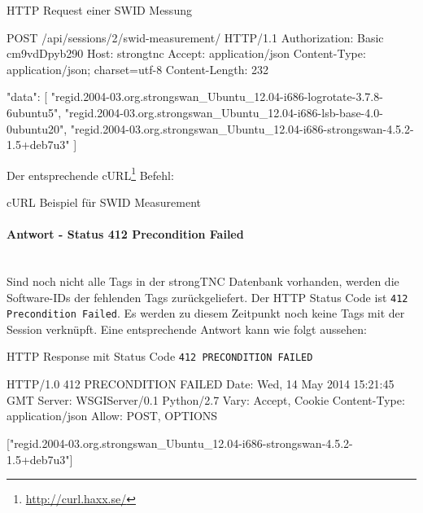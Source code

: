\begin{listing}[H]
\caption{HTTP Request einer SWID Messung}
\begin{httpcode}
POST /api/sessions/2/swid-measurement/ HTTP/1.1
Authorization: Basic cm9vdDpyb290
Host: strongtnc
Accept: application/json
Content-Type: application/json; charset=utf-8
Content-Length: 232

{
	"data":
	[
		"regid.2004-03.org.strongswan_Ubuntu_12.04-i686-logrotate-3.7.8-6ubuntu5",
		"regid.2004-03.org.strongswan_Ubuntu_12.04-i686-lsb-base-4.0-0ubuntu20",
		"regid.2004-03.org.strongswan_Ubuntu_12.04-i686-strongswan-4.5.2-1.5+deb7u3"
	]
}
\end{httpcode}
\end{listing}

Der entsprechende cURL\footnote{\url{http://curl.haxx.se/}} Befehl:

\begin{listing}[H]
\caption{cURL Beispiel für SWID Measurement}
\end{listing}

\paragraph{Antwort - Status 412 Precondition Failed} \hspace{0pt} \\
Sind noch nicht alle Tags in der strongTNC Datenbank vorhanden, werden die
Software-IDs der fehlenden Tags zurückgeliefert. Der HTTP Status Code ist
\texttt{412 Precondition Failed}. Es werden zu diesem Zeitpunkt noch keine Tags
mit der Session verknüpft. Eine entsprechende Antwort kann wie folgt aussehen:

\begin{listing}[H]
\caption{HTTP Response mit Status Code \texttt{412 PRECONDITION FAILED}}
\begin{httpcode}
HTTP/1.0 412 PRECONDITION FAILED
Date: Wed, 14 May 2014 15:21:45 GMT
Server: WSGIServer/0.1 Python/2.7
Vary: Accept, Cookie
Content-Type: application/json
Allow: POST, OPTIONS

["regid.2004-03.org.strongswan_Ubuntu_12.04-i686-strongswan-4.5.2-1.5+deb7u3"]
\end{httpcode}
\end{listing}

